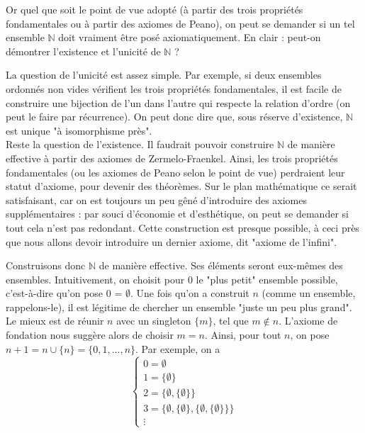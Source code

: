 \documentclass[french]{book}
\theoremstyle{plain}
\theoremstyle{definition}
\theoremstyle{remark}
\begin{document}
Or quel que soit le point de vue adopté (à partir des trois propriétés fondamentales ou à partir des axiomes de Peano), on peut se demander si un tel ensemble $\mathbb{N}$ doit vraiment être posé axiomatiquement. En clair : peut-on démontrer l'existence et l'unicité de $\mathbb{N}$ ? \\ \par

La question de l'unicité est assez simple. Par exemple, si deux ensembles ordonnés non vides vérifient les trois propriétés fondamentales, il est facile de construire une bijection de l'un dans l'autre qui respecte la relation d'ordre (on peut le faire par récurrence). On peut donc dire que, sous réserve d'existence, $\mathbb{N}$ est unique "à isomorphisme près".\\

Reste la question de l'existence. Il faudrait pouvoir construire $\mathbb{N}$ de manière effective à partir des axiomes de Zermelo-Fraenkel. Ainsi, les trois propriétés fondamentales (ou les axiomes de Peano selon le point de vue) perdraient leur statut d'axiome, pour devenir des théorèmes. Sur le plan mathématique ce serait satisfaisant, car on est toujours un peu gêné d'introduire des axiomes supplémentaires : par souci d'économie et d'esthétique, on peut se demander si tout cela n'est pas redondant. Cette construction est presque possible, à ceci près que nous allons devoir introduire un dernier axiome, dit "axiome de l'infini".\\ \par

Construisons donc $\mathbb{N}$ de manière effective. Ses éléments seront eux-mêmes des ensembles. Intuitivement, on choisit pour 0 le "plus petit" ensemble possible, c'est-à-dire qu'on pose 0 = $\emptyset$. Une fois qu'on a construit $n$ (comme un ensemble, rappelons-le), il est légitime de chercher un ensemble "juste un peu plus grand". Le mieux est de réunir $n$ avec un singleton $\{m\}$, tel que
$m \notin n$. L'axiome de fondation nous suggère alors de choisir $m=n$. Ainsi, pour tout $n$, on
pose $n+1 = n \cup \{n\} = \{0,1,...,n\}$. Par exemple, on a
$$\begin{cases}
	0=\emptyset\\
	1 = \{\emptyset\}\\
	2 = \{\emptyset, \{\emptyset\}\}\\
	3 = \{\emptyset, \{\emptyset\}, \{\emptyset, \{\emptyset\}\}\}\\
	\vdots
\end{cases}$$
\end{document}
